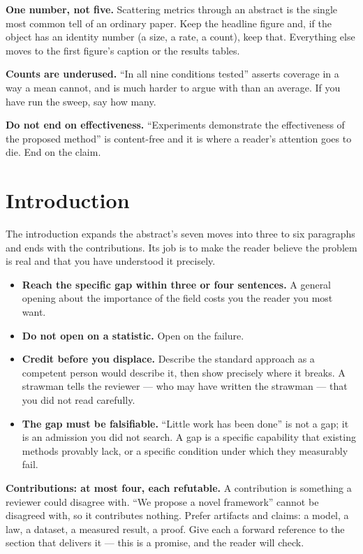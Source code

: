 \documentclass[11pt,a4paper]{article}
\newcommand{\lead}[1]{\medskip\noindent\textbf{#1}\quad}
\begin{document}
\lead{One number, not five.} Scattering metrics through an abstract is the
single most common tell of an ordinary paper. Keep the headline figure and,
if the object has an identity number (a size, a rate, a count), keep that.
Everything else moves to the first figure's caption or the results tables.

\lead{Counts are underused.} ``In all nine conditions tested'' asserts
coverage in a way a mean cannot, and is much harder to argue with than an
average. If you have run the sweep, say how many.

\lead{Do not end on effectiveness.} ``Experiments demonstrate the
effectiveness of the proposed method'' is content-free and it is where a
reader's attention goes to die. End on the claim.

\section{Introduction}

The introduction expands the abstract's seven moves into three to six
paragraphs and ends with the contributions. Its job is to make the reader
believe the problem is real and that you have understood it precisely.

\begin{itemize}
  \item \textbf{Reach the specific gap within three or four sentences.} A
    general opening about the importance of the field costs you the reader you
    most want.
  \item \textbf{Do not open on a statistic.} Open on the failure.
  \item \textbf{Credit before you displace.} Describe the standard approach
    as a competent person would describe it, then show precisely where it
    breaks. A strawman tells the reviewer --- who may have written the
    strawman --- that you did not read carefully.
  \item \textbf{The gap must be falsifiable.} ``Little work has been done''
    is not a gap; it is an admission you did not search. A gap is a specific
    capability that existing methods provably lack, or a specific condition
    under which they measurably fail.
\end{itemize}

\lead{Contributions: at most four, each refutable.} A contribution is
something a reviewer could disagree with. ``We propose a novel framework''
cannot be disagreed with, so it contributes nothing. Prefer artifacts and
claims: a model, a law, a dataset, a measured result, a proof. Give each a
forward reference to the section that delivers it --- this is a promise, and
the reader will check.
\end{document}
